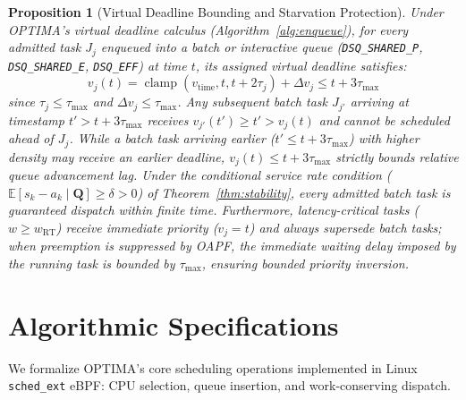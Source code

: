 \documentclass[conference]{IEEEtran}
\newtheorem{proposition}{Proposition}
\begin{document}
\begin{proposition}[Virtual Deadline Bounding and Starvation Protection]
\label{prop:starvation}
Under OPTIMA's virtual deadline calculus (Algorithm~\ref{alg:enqueue}), for every admitted task $J_j$ enqueued into a batch or interactive queue (\texttt{DSQ\_SHARED\_P}, \texttt{DSQ\_SHARED\_E}, \texttt{DSQ\_EFF}) at time $t$, its assigned virtual deadline satisfies:
\begin{equation}
v_j(t) = \operatorname{clamp}(v_{\mathrm{time}}, t, t + 2\tau_j) + \Delta v_j \le t + 3\tau_{\max}
\end{equation}
since $\tau_j \le \tau_{\max}$ and $\Delta v_j \le \tau_{\max}$. Any subsequent batch task $J_{j'}$ arriving at timestamp $t' > t + 3\tau_{\max}$ receives $v_{j'}(t') \ge t' > v_j(t)$ and cannot be scheduled ahead of $J_j$. While a batch task arriving earlier ($t' \le t + 3\tau_{\max}$) with higher density may receive an earlier deadline, $v_j(t) \le t + 3\tau_{\max}$ strictly bounds relative queue advancement lag. Under the conditional service rate condition ($\mathbb{E}[s_k - a_k \mid \mathbf{Q}] \ge \delta > 0$) of Theorem~\ref{thm:stability}, every admitted batch task is guaranteed dispatch within finite time. Furthermore, latency-critical tasks ($w \ge w_{\mathrm{RT}}$) receive immediate priority ($v_j = t$) and always supersede batch tasks; when preemption is suppressed by OAPF, the immediate waiting delay imposed by the running task is bounded by $\tau_{\max}$, ensuring bounded priority inversion.
\end{proposition}

\section{Algorithmic Specifications}
\label{sec:algorithms}

We formalize OPTIMA's core scheduling operations implemented in Linux \texttt{sched\_ext} eBPF: CPU selection, queue insertion, and work-conserving dispatch.
\end{document}
